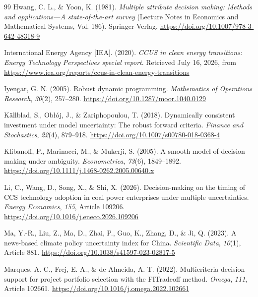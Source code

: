 \documentclass[5p,times,authoryear]{elsarticle}
\theoremstyle{plain}
\begin{document}
\begin{thebibliography}{99}
Hwang, C. L., \& Yoon, K. (1981). \emph{Multiple attribute decision making: Methods and applications---A state-of-the-art survey} (Lecture Notes in Economics and Mathematical Systems, Vol. 186). Springer-Verlag. \url{https://doi.org/10.1007/978-3-642-48318-9}

International Energy Agency [IEA]. (2020). \emph{CCUS in clean energy transitions: Energy Technology Perspectives special report}. Retrieved July 16, 2026, from \url{https://www.iea.org/reports/ccus-in-clean-energy-transitions}

Iyengar, G. N. (2005). Robust dynamic programming. \emph{Mathematics of Operations Research}, \emph{30}(2), 257--280. \url{https://doi.org/10.1287/moor.1040.0129}

K\"allblad, S., Ob\l{}\'oj, J., \& Zariphopoulou, T. (2018). Dynamically consistent investment under model uncertainty: The robust forward criteria. \emph{Finance and Stochastics}, \emph{22}(4), 879--918. \url{https://doi.org/10.1007/s00780-018-0368-4}

Klibanoff, P., Marinacci, M., \& Mukerji, S. (2005). A smooth model of decision making under ambiguity. \emph{Econometrica}, \emph{73}(6), 1849--1892. \url{https://doi.org/10.1111/j.1468-0262.2005.00640.x}

Li, C., Wang, D., Song, X., \& Shi, X. (2026). Decision-making on the timing of CCS technology adoption in coal power enterprises under multiple uncertainties. \emph{Energy Economics}, \emph{155}, Article 109206. \url{https://doi.org/10.1016/j.eneco.2026.109206}

Ma, Y.-R., Liu, Z., Ma, D., Zhai, P., Guo, K., Zhang, D., \& Ji, Q. (2023). A news-based climate policy uncertainty index for China. \emph{Scientific Data}, \emph{10}(1), Article 881. \url{https://doi.org/10.1038/s41597-023-02817-5}

Marques, A. C., Frej, E. A., \& de Almeida, A. T. (2022). Multicriteria decision support for project portfolio selection with the FITradeoff method. \emph{Omega}, \emph{111}, Article 102661. \url{https://doi.org/10.1016/j.omega.2022.102661}


\end{thebibliography}
\end{document}
